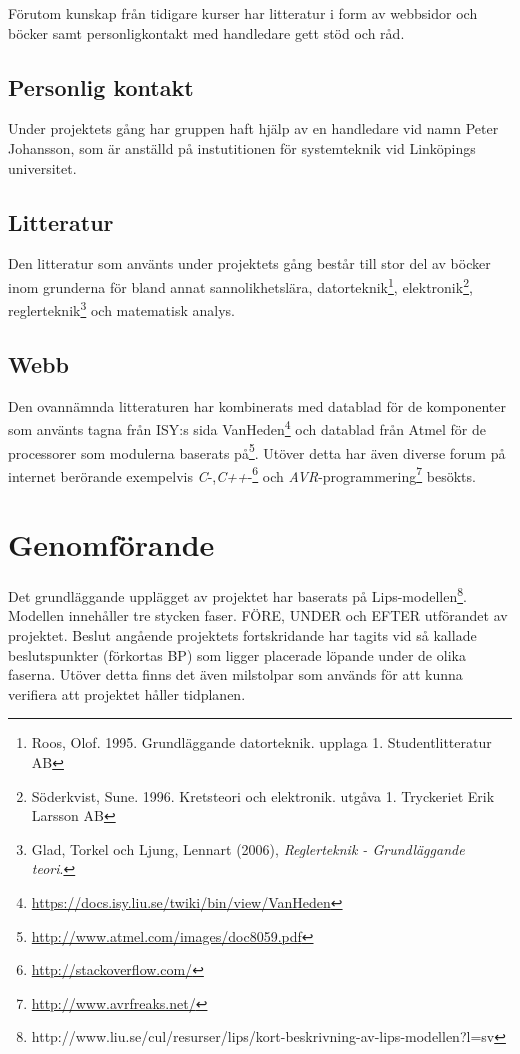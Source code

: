 \documentclass[a4paper,12pt,fleqn]{article}
\begin{document}
Förutom kunskap från tidigare kurser har litteratur i form av webbsidor och böcker samt personligkontakt med handledare gett stöd och råd. 

\subsection{Personlig kontakt}
Under projektets gång har gruppen haft hjälp av en handledare vid namn Peter Johansson, som är anställd på instutitionen för systemteknik vid Linköpings universitet. 

\subsection{Litteratur}
Den litteratur som använts under projektets gång består till stor del av böcker inom grunderna för bland annat sannolikhetslära, datorteknik\footnote{Roos, Olof. 1995. Grundläggande datorteknik. upplaga 1. Studentlitteratur AB}, elektronik\footnote{Söderkvist, Sune. 1996. Kretsteori och elektronik. utgåva 1. Tryckeriet Erik Larsson AB}, reglerteknik\footnote{Glad, Torkel och Ljung, Lennart (2006), \textit{Reglerteknik - Grundläggande teori}.} och matematisk analys.

\subsection{Webb}
Den ovannämnda litteraturen har kombinerats med datablad för de komponenter som använts tagna från ISY:s sida VanHeden\footnote{\url{https://docs.isy.liu.se/twiki/bin/view/VanHeden}} och datablad från Atmel för de processorer som modulerna baserats på\footnote{\url{http://www.atmel.com/images/doc8059.pdf}}. 
Utöver detta har även diverse forum på internet berörande exempelvis \emph{C}-,\emph{C++}-\footnote{\url{http://stackoverflow.com/}} och \emph{AVR}-programmering\footnote{\url{http://www.avrfreaks.net/}} besökts.


\section{Genomförande}

Det grundläggande upplägget av projektet har baserats på Lips-modellen\footnote{http://www.liu.se/cul/resurser/lips/kort-beskrivning-av-lips-modellen?l=sv}. Modellen innehåller tre stycken faser. FÖRE, UNDER och EFTER utförandet av projektet. Beslut angående projektets fortskridande har tagits vid så kallade beslutspunkter (förkortas BP) som ligger placerade löpande under de olika faserna. Utöver detta finns det även milstolpar som används för att kunna verifiera att projektet håller tidplanen. 
\end{document}
